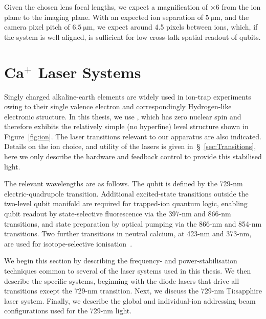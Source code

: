     Given the chosen lens focal lengths, we expect a magnification of $\times 6$ from the ion plane to the imaging plane. With an expected ion separation of $5~\unit{\micro\meter}$, and the camera pixel pitch of $6.5~\unit{\micro\meter}$, we expect around 4.5 pixels between ions, which, if the system is well aligned, is sufficient for low cross-talk spatial readout of qubits.
    
\section{Ca$^+$ Laser Systems}	
\label{sec:Laser systems}

    Singly charged alkaline-earth elements are widely used in ion-trap
    experiments owing to their single valence electron and correspondingly
    Hydrogen-like electronic structure. In this thesis, we use \ca , which has
    zero nuclear spin and therefore exhibits the relatively simple (no
    hyperfine) level structure shown in Figure~\ref{fig:ion}. The laser
    transitions relevant to our apparatus are also indicated.
    Details on the ion choice, and utility of the lasers is given
    in~\S~\ref{sec:Transitions}, here we only describe the hardware and feedback
    control to provide this stabilised light.

    The relevant wavelengths are as follows. The qubit is defined by the 729-nm
    electric-quadrupole transition. Additional excited-state transitions outside
    the two-level qubit manifold are required for trapped-ion quantum logic,
    enabling qubit readout by state-selective fluorescence via the 397-nm and
    866-nm transitions, and state preparation by optical pumping via the 866-nm
    and 854-nm transitions. Two further transitions in neutral calcium, at
    423-nm and 373-nm, are used for isotope-selective
    ionisation~\cite{lucas_isotope-selective_2004}.

    We begin this section by describing the frequency- and power-stabilisation
    techniques common to several of the laser systems used in this thesis. We
    then describe the specific systems, beginning with the diode lasers that
    drive all transitions except the 729-nm transition. Next, we discuss the
    729-nm Ti:sapphire laser system. Finally, we describe the global and
    individual-ion addressing beam configurations used for the 729-nm light.


